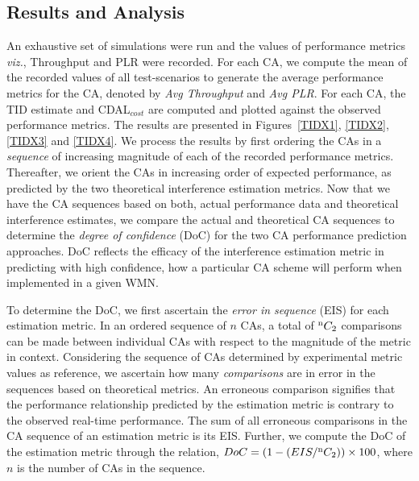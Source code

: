\documentclass[conference]{IEEEtran}
\begin{document}
\subsection{Results and Analysis}
An exhaustive set of simulations were run and the values of performance metrics \emph{viz.}, Throughput and PLR were recorded. For each CA, we compute the mean of the recorded values of all test-scenarios to generate the average performance metrics for the CA, denoted by \textit{Avg Throughput} and \textit{Avg PLR}. For each CA, the TID estimate and CDAL$_{cost}$ are computed and plotted against the observed performance metrics. The results are presented in Figures~\ref{TIDX1}, \ref{TIDX2}, \ref{TIDX3} and \ref{TIDX4}.
We process the results by first ordering the CAs in a \textit{sequence} of increasing magnitude of each of the recorded performance metrics. Thereafter, we orient the CAs in increasing order of expected performance, as predicted by the two theoretical interference estimation metrics. Now that we have the CA sequences based on both, actual performance data and theoretical interference estimates, we compare the actual and theoretical CA sequences to determine the \textit{degree of confidence} (DoC) for the two CA performance prediction approaches. DoC reflects the efficacy of the interference estimation metric in predicting with high confidence, how a particular CA scheme will perform when implemented in a given WMN.

To determine the DoC, we first ascertain the \textit{error in sequence} (EIS) for each estimation metric. In an ordered sequence of $n$ CAs, a total of  $\textsuperscript n C_2$ comparisons can be made between individual CAs with respect to the magnitude of the metric in context. Considering the sequence of CAs determined by experimental metric values as reference, we ascertain how many \textit{comparisons} are in error in the sequences based on theoretical metrics. An erroneous comparison signifies that the performance relationship predicted by the estimation metric is contrary to the observed real-time performance. The sum of all erroneous comparisons in the CA sequence of an estimation metric is its EIS. Further, we compute the DoC of the estimation metric through the relation, \mbox{$DoC = (1-(EIS/\textsuperscript n C_2))\times100$}, where $n$ is the number of CAs in the sequence.
\end{document}
